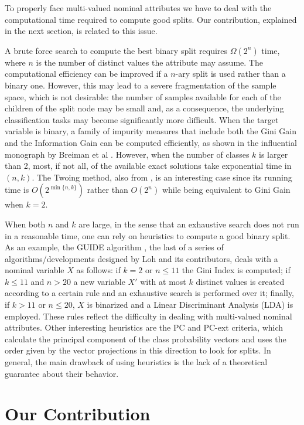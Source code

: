 To properly face  multi-valued nominal attributes we have to deal with the computational time required to compute good splits. Our contribution, explained in the next section, is related to this issue. 
 
A brute force search to compute the best binary split 
requires $\Omega(2^n)$ time, where $n$ is the number of distinct values the attribute may assume. The computational efficiency can be improved if a $n$-ary split is used rather than a binary one. However,  this may lead to a severe fragmentation of the sample space, which is not desirable: the number of samples available for each of the children of the split node 
may be small and, as a consequence, the underlying classification tasks may become significantly more difficult.
When the target variable is binary, a family of impurity measures that include both the Gini Gain and the Information Gain can be computed efficiently, as shown
in the influential monograph by Breiman et al \cite{Breiman84}.
However, when the number of classes $k$ is larger than 2,
most, if not all, of the available exact solutions take exponential time
in $(n,k)$.
The Twoing method, also from \cite{Breiman84}, 
is an  interesting case since its running time is $O(2^{\min\{n,k\}})$ rather than $O( 2^ n)$ while being equivalent to
Gini Gain when $k=2$.

When both $n$ and $k$ are large, in the sense that an exhaustive search does not run in a reasonable time, one can rely on heuristics to compute a good binary split.
As an example, the GUIDE algorithm  \cite{Loh2009}, the  last
of a series of algorithms/developments designed by Loh and its contributors, 
deals with a nominal variable $X$
as follows: if $k=2$ or $n \le 11$ the Gini Index is computed;
if $k \le 11$ and $n > 20$ a new variable $X'$ with at most $k$ distinct values is created according to a certain rule and an exhaustive search is performed over it;  finally, if $k > 11$ or $n \le 20$,  $X$ is binarized and a Linear Discriminant Analysis (LDA) is employed.
These rules reflect the difficulty in dealing with multi-valued nominal attributes. Other interesting heuristics are the PC and PC-ext criteria, which calculate the principal component of the class probability vectors and uses the order given by the vector projections in this direction to look for splits.
In general, the main drawback of using heuristics is the lack of a theoretical guarantee about their behavior. 


\section{Our Contribution}
\label{sec:contribution}

